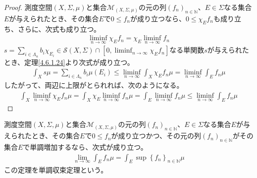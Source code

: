 \documentclass[dvipdfmx]{jsarticle}
\begin{document}
\begin{proof}
測度空間$(X,\varSigma,\mu)$と集合$\mathcal{M}_{(X,\varSigma,\mu)}$の元の列$\left( f_{n} \right)_{n \in \mathbb{N}}$、$E \in \varSigma$なる集合$E$が与えられたとき、その集合$E$で$0 \leq f_{n}$が成り立つなら、$0 \leq \chi_{E}f_{n}$も成り立ち、さらに、次式も成り立つ。
\begin{align*}
\liminf_{n \rightarrow \infty}{\chi_{E}f_{n}} = \chi_{E}\liminf_{n \rightarrow \infty}f_{n}
\end{align*}
$s = \sum_{i \in \varLambda_{n}} {b_{i}\chi_{E_{i}}}\in \mathcal{S}(X,\varSigma) \cap \left[ 0,\liminf_{n \rightarrow \infty}{\chi_{E}f_{n}} \right]$なる単関数$s$が与えられたとき、定理\ref{4.6.1.24}より次式が成り立つ。
\begin{align*}
\int_{X} {s\mu} = \sum_{i \in \varLambda_{n}} {b_{i}\mu\left( E_{i} \right)} \leq \liminf_{n \rightarrow \infty}{\int_{X} {\chi_{E}f_{n}\mu}} = \liminf_{n \rightarrow \infty}{\int_{E} {f_{n}\mu}}
\end{align*}
したがって、両辺に上限がとられれば、次のようになる。
\begin{align*}
\int_{X} {\liminf_{n \rightarrow \infty}{\chi_{E}f_{n}}\mu} = \int_{X} {\chi_{E}\liminf_{n \rightarrow \infty}f_{n}\mu} = \int_{E} {\liminf_{n \rightarrow \infty}f_{n}\mu} \leq \liminf_{n \rightarrow \infty}{\int_{E} {f_{n}\mu}}
\end{align*}
\end{proof}
\begin{thm}[単調収束定理]\label{4.6.1.26}
測度空間$(X,\varSigma,\mu)$と集合$\mathcal{M}_{(X,\varSigma,\mu)}$の元の列$\left( f_{n} \right)_{n \in \mathbb{N}}$、$E \in \varSigma$なる集合$E$が与えられたとき、その集合$E$で$0 \leq f_{n}$が成り立つかつ、その元の列$\left( f_{n} \right)_{n \in \mathbb{N}}$がその集合$E$で単調増加するなら、次式が成り立つ。
\begin{align*}
\lim_{n \rightarrow \infty}{\int_{E} {f_{n}\mu}} = \int_{E} {\sup\left\{ f_{n} \right\}_{n \in \mathbb{N}}\mu}
\end{align*}
この定理を単調収束定理という。
\end{thm}
\end{document}
